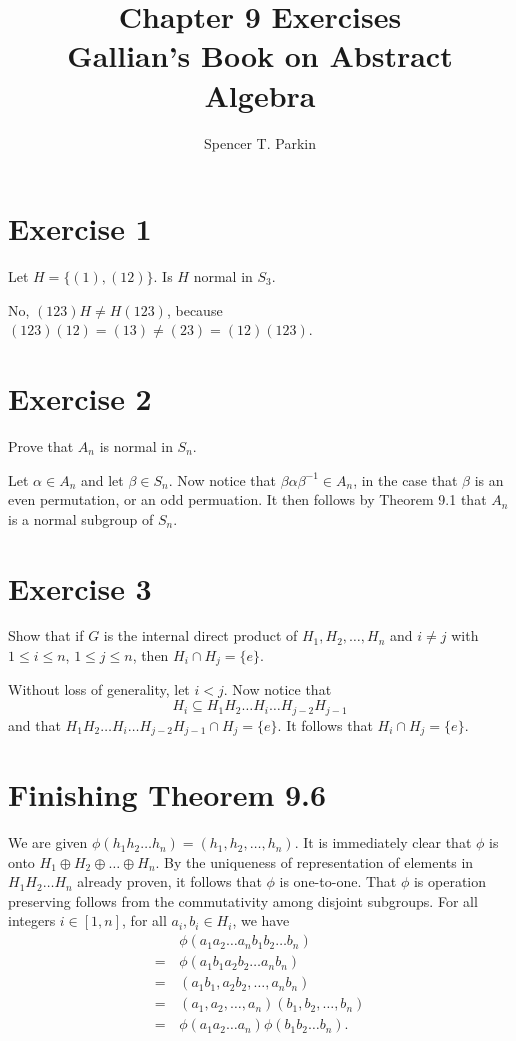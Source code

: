 \documentclass[12pt]{article}
\title{Chapter 9 Exercises\\Gallian's Book on Abstract Algebra}
\author{Spencer T. Parkin}
\begin{document}
\maketitle

\section*{Exercise 1}

Let $H=\{(1),(12)\}$.  Is $H$ normal in $S_3$.

No, $(123)H\neq H(123)$, because $(123)(12)=(13)\neq(23)=(12)(123)$.

\section*{Exercise 2}

Prove that $A_n$ is normal in $S_n$.

Let $\alpha\in A_n$ and let $\beta\in S_n$.  Now notice that $\beta\alpha\beta^{-1}\in A_n$,
in the case that $\beta$ is an even permutation, or an odd permuation.
It then follows by Theorem 9.1 that $A_n$ is a normal subgroup of $S_n$.

\section*{Exercise 3}

Show that if $G$ is the internal direct product of $H_1,H_2,\dots,H_n$ and
$i\neq j$ with $1\leq i\leq n$, $1\leq j\leq n$, then $H_i\cap H_j=\{e\}$.

Without loss of generality, let $i<j$.
Now notice that
\begin{equation*}
H_i\subseteq H_1H_2\dots H_i\dots H_{j-2}H_{j-1}
\end{equation*}
and that $H_1H_2\dots H_i\dots H_{j-2}H_{j-1}\cap H_j=\{e\}$.
It follows that $H_i\cap H_j=\{e\}$.

\section*{Finishing Theorem 9.6}

We are given $\phi(h_1h_2\dots h_n)=(h_1,h_2,\dots,h_n)$.
It is immediately clear that $\phi$ is onto $H_1\oplus H_2\oplus\dots\oplus H_n$.
By the uniqueness of representation of elements in $H_1H_2\dots H_n$ already proven,
it follows that $\phi$ is one-to-one.  That $\phi$ is operation preserving follows
from the commutativity among disjoint subgroups.  For all integers $i\in[1,n]$,
for all $a_i,b_i\in H_i$, we have
\begin{align*}
 & \phi(a_1a_2\dots a_nb_1b_2\dots b_n) \\
 =\,&\phi(a_1b_1a_2b_2\dots a_nb_n) \\
 =\,&(a_1b_1,a_2b_2,\dots,a_nb_n) \\
 =\,&(a_1,a_2,\dots,a_n)(b_1,b_2,\dots,b_n) \\
 =\,&\phi(a_1a_2\dots a_n)\phi(b_1b_2\dots b_n).
\end{align*}
\end{document}
